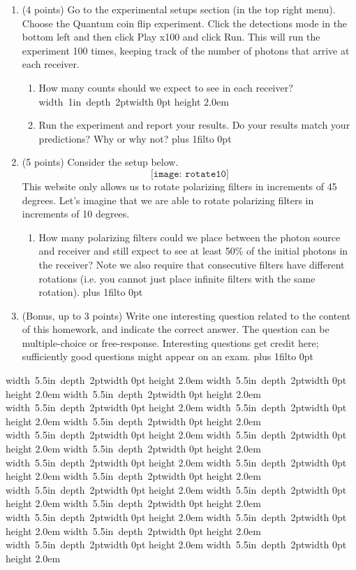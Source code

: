 \documentclass[12pt]{article}
\newcommand{\Blank}{\mbox{\hskip 4pt\vrule width 1in depth 2pt}\vrule width 0pt height 2.0em}
\newcommand{\BlankLine}{\mbox{\hskip 4pt\vrule width 5.5in depth 2pt}\vrule width 0pt height 2.0em}
\def\DefaultSpace{1in}
\newcommand{\LeaveSpace}[1][\DefaultSpace]{%
\vskip #1 plus 1fil\relax\hbox to 0pt{\hss} %
}
\begin{document}
\begin{enumerate}[font=\bfseries]
\begin{enumerate}
        \item What is the maximum possible combined probability of a photon arriving at Receiver A or Receiver B? Why?\LeaveSpace{}
    \end{enumerate}
    \item (4 points) Go to the experimental setups section (in the top right menu). Choose the Quantum coin flip experiment. Click the detections mode in the bottom left and then click Play x100 and click Run. This will run the experiment 100 times, keeping track of the number of photons that arrive at each receiver. 
    \begin{enumerate}
        \item How many counts should we expect to see in each receiver? \Blank{}
        \item Run the experiment and report your results. Do your results match your predictions? Why or why not?
        \LeaveSpace[1.5in]
    \end{enumerate}
    \item (5 points) Consider the setup below.
    \[\texttt{[image: rotate10]}\]
    This website only allows us to rotate polarizing filters in increments of 45 degrees. Let's imagine that we are able to rotate polarizing filters in increments of 10 degrees.
    \begin{enumerate}
        \item How many polarizing filters could we place between the photon source and receiver and still expect to see at least 50\% of the initial photons in the receiver? Note we also require that consecutive filters have different rotations (i.e. you cannot just place infinite filters with the same rotation).\LeaveSpace{}
    \end{enumerate}
    \item (Bonus, up to 3 points) Write one interesting question related to the content of this homework, and indicate the correct answer. The question can be multiple-choice or free-response.  Interesting questions get credit here;  sufficiently good questions might appear on an exam.\LeaveSpace{}
\end{enumerate}
\newpage
\noindent \BlankLine{}
\BlankLine{}
\BlankLine{}
\BlankLine{}
\BlankLine{}
\BlankLine{}
\BlankLine{}
\BlankLine{}
\BlankLine{}
\BlankLine{}
\BlankLine{}
\BlankLine{}
\BlankLine{}
\BlankLine{}
\BlankLine{}
\BlankLine{}
\BlankLine{}
\BlankLine{}
\BlankLine{}
\BlankLine{}
\end{document}
